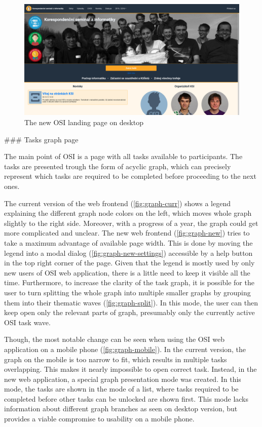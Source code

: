 \documentclass[
  digital, %
  oneside, %
  lof,     %
  lot,     %
]{fithesis4}
\begin{document}
{\begin{figure}
\includegraphics[width=\textwidth]{assets/img/welcome_new}
\caption{The new OSI landing page on desktop}
\label{fig:welcome-new}
\end{figure}

### Tasks graph page

The main point of OSI is a page with all tasks available to participants. The tasks are presented trough the form of acyclic graph, which can precisely represent which tasks are required to be completed before proceeding to the next ones.

The current version of the web frontend (\ref{fig:graph-curr}) shows a legend explaining the different graph node colors on the left, which moves whole graph slightly to the right side. Moreover, with a progress of a year, the graph could get more complicated and unclear. The new web frontend (\ref{fig:graph-new}) tries to take a maximum advantage of available page width. This is done by moving the legend into a modal dialog (\ref{fig:graph-new-settings}) accessible by a help button in the top right corner of the page. Given that the legend is mostly used by only new users of OSI web application, there is a little need to keep it visible all the time. Furthermore, to increase the clarity of the task graph, it is possible for the user to turn splitting the whole graph into multiple smaller graphs by grouping them into their thematic waves (\ref{fig:graph-split}). In this mode, the user can then keep open only the relevant parts of graph, presumably only the currently active OSI task wave.

Though, the most notable change can be seen when using the OSI web application on a mobile phone (\ref{fig:graph-mobile}). In the current version, the graph on the mobile is too narrow to fit, which results in multiple tasks overlapping. This makes it nearly impossible to open correct task. Instead, in the new web application, a special graph presentation mode was created. In this mode, the tasks are shown in the mode of a list, where tasks required to be completed before other tasks can be unlocked are shown first. This mode lacks information about different graph branches as seen on desktop version, but provides a viable compromise to usability on a mobile phone.

}
\end{document}
